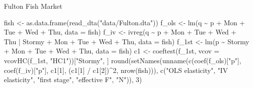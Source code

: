 \documentclass[
  11pt,
  ignorenonframetext,
  aspectratio=169,
]{beamer}
\newenvironment{Shaded}{\begin{snugshade}}{\end{snugshade}}
\newcommand{\AttributeTok}[1]{\textcolor[rgb]{0.40,0.45,0.13}{#1}}
\newcommand{\DecValTok}[1]{\textcolor[rgb]{0.68,0.00,0.00}{#1}}
\newcommand{\FunctionTok}[1]{\textcolor[rgb]{0.28,0.35,0.67}{#1}}
\newcommand{\NormalTok}[1]{\textcolor[rgb]{0.00,0.23,0.31}{#1}}
\newcommand{\OtherTok}[1]{\textcolor[rgb]{0.00,0.23,0.31}{#1}}
\newcommand{\SpecialCharTok}[1]{\textcolor[rgb]{0.37,0.37,0.37}{#1}}
\newcommand{\StringTok}[1]{\textcolor[rgb]{0.13,0.47,0.30}{#1}}
\begin{document}
\begin{frame}[fragile]{Fulton Fish Market}
\protect{}\label{fulton-fish-market}
\begin{Shaded}
\begin{Highlighting}[]
\NormalTok{fish }\OtherTok{\textless{}{-}} \FunctionTok{as.data.frame}\NormalTok{(}\FunctionTok{read\_dta}\NormalTok{(}\StringTok{"data/Fulton.dta"}\NormalTok{))}
\NormalTok{f\_ols }\OtherTok{\textless{}{-}} \FunctionTok{lm}\NormalTok{(q }\SpecialCharTok{\textasciitilde{}}\NormalTok{ p }\SpecialCharTok{+}\NormalTok{ Mon }\SpecialCharTok{+}\NormalTok{ Tue }\SpecialCharTok{+}\NormalTok{ Wed }\SpecialCharTok{+}\NormalTok{ Thu, }\AttributeTok{data =}\NormalTok{ fish)}
\NormalTok{f\_iv  }\OtherTok{\textless{}{-}} \FunctionTok{ivreg}\NormalTok{(q }\SpecialCharTok{\textasciitilde{}}\NormalTok{ p }\SpecialCharTok{+}\NormalTok{ Mon }\SpecialCharTok{+}\NormalTok{ Tue }\SpecialCharTok{+}\NormalTok{ Wed }\SpecialCharTok{+}\NormalTok{ Thu }\SpecialCharTok{|}\NormalTok{ Stormy }\SpecialCharTok{+}\NormalTok{ Mon }\SpecialCharTok{+}\NormalTok{ Tue }\SpecialCharTok{+}\NormalTok{ Wed }\SpecialCharTok{+}\NormalTok{ Thu, }\AttributeTok{data =}\NormalTok{ fish)}
\NormalTok{f\_1st }\OtherTok{\textless{}{-}} \FunctionTok{lm}\NormalTok{(p }\SpecialCharTok{\textasciitilde{}}\NormalTok{ Stormy }\SpecialCharTok{+}\NormalTok{ Mon }\SpecialCharTok{+}\NormalTok{ Tue }\SpecialCharTok{+}\NormalTok{ Wed }\SpecialCharTok{+}\NormalTok{ Thu, }\AttributeTok{data =}\NormalTok{ fish)}
\NormalTok{c1 }\OtherTok{\textless{}{-}} \FunctionTok{coeftest}\NormalTok{(f\_1st, }\AttributeTok{vcov =} \FunctionTok{vcovHC}\NormalTok{(f\_1st, }\StringTok{"HC1"}\NormalTok{))[}\StringTok{"Stormy"}\NormalTok{, ]}
\FunctionTok{round}\NormalTok{(}\FunctionTok{setNames}\NormalTok{(}\FunctionTok{unname}\NormalTok{(}\FunctionTok{c}\NormalTok{(}\FunctionTok{coef}\NormalTok{(f\_ols)[}\StringTok{"p"}\NormalTok{], }\FunctionTok{coef}\NormalTok{(f\_iv)[}\StringTok{"p"}\NormalTok{], c1[}\DecValTok{1}\NormalTok{],}
\NormalTok{                        (c1[}\DecValTok{1}\NormalTok{] }\SpecialCharTok{/}\NormalTok{ c1[}\DecValTok{2}\NormalTok{])}\SpecialCharTok{\^{}}\DecValTok{2}\NormalTok{, }\FunctionTok{nrow}\NormalTok{(fish))),}
               \FunctionTok{c}\NormalTok{(}\StringTok{"OLS elasticity"}\NormalTok{, }\StringTok{"IV elasticity"}\NormalTok{, }\StringTok{"first stage"}\NormalTok{,}
                 \StringTok{"effective F"}\NormalTok{, }\StringTok{"N"}\NormalTok{)), }\DecValTok{3}\NormalTok{)}
\end{Highlighting}
\end{Shaded}


\end{frame}
\end{document}
